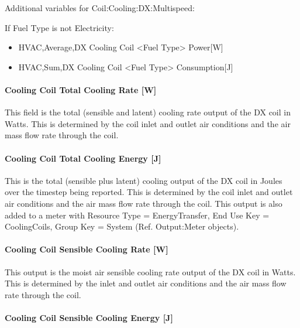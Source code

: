 Additional variables for Coil:Cooling:DX:Multispeed:

If Fuel Type is not Electricity:

\begin{itemize}
\item
  HVAC,Average,DX Cooling Coil \textless{}Fuel Type\textgreater{} Power{[}W{]}
\item
  HVAC,Sum,DX Cooling Coil \textless{}Fuel Type\textgreater{} Consumption{[}J{]}
\end{itemize}

\paragraph{}\label{section}

\paragraph{Cooling Coil Total Cooling Rate {[}W{]}}\label{cooling-coil-total-cooling-rate-w-4}

This field is the total (sensible and latent) cooling rate output of the DX coil in Watts. This is determined by the coil inlet and outlet air conditions and the air mass flow rate through the coil.

\paragraph{Cooling Coil Total Cooling Energy {[}J{]}}\label{cooling-coil-total-cooling-energy-j-4}

This is the total (sensible plus latent) cooling output of the DX coil in Joules over the timestep being reported. This is determined by the coil inlet and outlet air conditions and the air mass flow rate through the coil. This output is also added to a meter with Resource Type = EnergyTransfer, End Use Key = CoolingCoils, Group Key = System (Ref. Output:Meter objects).

\paragraph{Cooling Coil Sensible Cooling Rate {[}W{]}}\label{cooling-coil-sensible-cooling-rate-w-4}

This output is the moist air sensible cooling rate output of the DX coil in Watts. This is determined by the inlet and outlet air conditions and the air mass flow rate through the coil.

\paragraph{Cooling Coil Sensible Cooling Energy {[}J{]}}\label{cooling-coil-sensible-cooling-energy-j-4}

